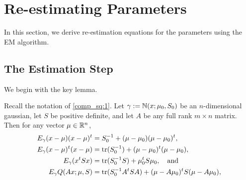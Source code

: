 \documentclass[12pt,leqno]{article}
\begin{document}
\newpage
\section{Re-estimating Parameters}
In this section, we derive re-estimation equations for the parameters using the EM algorithm.
\subsection{The Estimation Step}
We begin with the key lemma.
    
  \begin{Lem}\label{exp_log}
    Recall the notation of \eqref{comp_sq:1}. Let $\gamma := {\mathbb N}(x;\mu_0,S_0)$ be an $n$-dimensional gaussian,  let $S$ be
    positive definite, and let $A$ be any
    full rank $m\times{n}$ matrix. Then for any vector $\mu\in{\mathbb R}^n$, 
    \begin{align}
      E_{\gamma}(x-\mu)(x-\mu)^t &= S_0^{-1} + (\mu-\mu_0)(\mu-\mu_0)^t, \label{E_xx^t}\\
      E_{\gamma}(x-\mu)^t(x - \mu) &=  \text{\rm tr}(S_0^{-1}) + (\mu-\mu_0)^t(\mu-\mu_0), \label{E_x^tx}\\
      E_{\gamma}(x^tSx) &= \text{\rm tr}(S_0^{-1}S) + \mu_0^tS\mu_0, \quad\text{and} \label{E_x^tSx} \\
      E_{\gamma}{Q}(Ax;\mu,S) &=  \text{\rm tr}(S_0^{-1}A^tSA) + (\mu-A\mu_0)^tS(\mu-A\mu_0), \label{E_Q}
    \end{align}
  \end{Lem}
\end{document}
